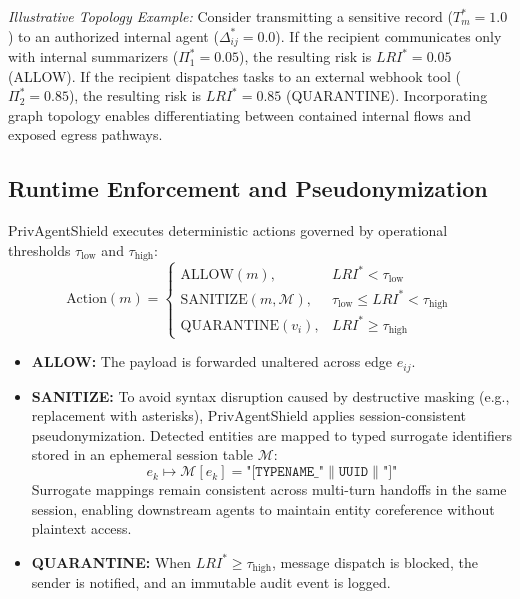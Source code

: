 \documentclass[conference]{IEEEtran}
\begin{document}
\textit{Illustrative Topology Example:} Consider transmitting a sensitive record ($T^*_m = 1.0$) to an authorized internal agent ($\Delta^*_{ij} = 0.0$). If the recipient communicates only with internal summarizers ($\Pi^*_1 = 0.05$), the resulting risk is $LRI^* = 0.05$ (ALLOW). If the recipient dispatches tasks to an external webhook tool ($\Pi^*_2 = 0.85$), the resulting risk is $LRI^* = 0.85$ (QUARANTINE). Incorporating graph topology enables differentiating between contained internal flows and exposed egress pathways.

\subsection{Runtime Enforcement and Pseudonymization}
PrivAgentShield executes deterministic actions governed by operational thresholds $\tau_{\text{low}}$ and $\tau_{\text{high}}$:
\begin{equation}
\text{Action}(m) = \begin{cases} 
\text{ALLOW}(m), & LRI^* < \tau_{\text{low}} \\ 
\text{SANITIZE}(m, \mathcal{M}), & \tau_{\text{low}} \le LRI^* < \tau_{\text{high}} \\ 
\text{QUARANTINE}(v_i), & LRI^* \ge \tau_{\text{high}} 
\end{cases}
\end{equation}
\begin{itemize}
    \item \textbf{ALLOW:} The payload is forwarded unaltered across edge $e_{ij}$.
    \item \textbf{SANITIZE:} To avoid syntax disruption caused by destructive masking (e.g., replacement with asterisks), PrivAgentShield applies session-consistent pseudonymization. Detected entities are mapped to typed surrogate identifiers stored in an ephemeral session table $\mathcal{M}$:
    \begin{equation}
    e_k \mapsto \mathcal{M}[e_k] = \texttt{"[TYPENAME\_"} \parallel \texttt{UUID} \parallel \texttt{"]"}
    \end{equation}
    Surrogate mappings remain consistent across multi-turn handoffs in the same session, enabling downstream agents to maintain entity coreference without plaintext access.
    \item \textbf{QUARANTINE:} When $LRI^* \ge \tau_{\text{high}}$, message dispatch is blocked, the sender is notified, and an immutable audit event is logged.
\end{itemize}
\end{document}
